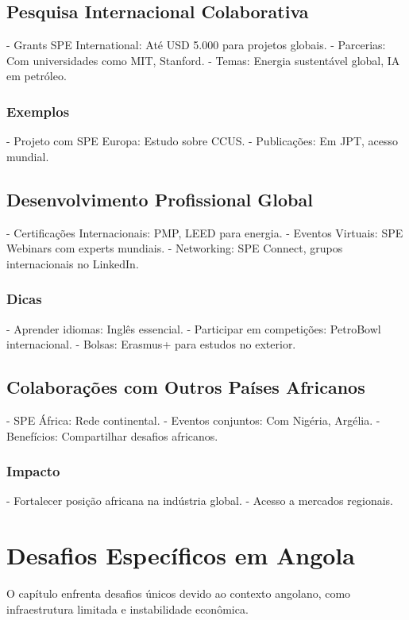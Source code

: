 \documentclass[12pt]{article}
\begin{document}
\subsection{Pesquisa Internacional Colaborativa}
- Grants SPE International: Até USD 5.000 para projetos globais.
- Parcerias: Com universidades como MIT, Stanford.
- Temas: Energia sustentável global, IA em petróleo.

\subsubsection{Exemplos}
- Projeto com SPE Europa: Estudo sobre CCUS.
- Publicações: Em JPT, acesso mundial.

\subsection{Desenvolvimento Profissional Global}
- Certificações Internacionais: PMP, LEED para energia.
- Eventos Virtuais: SPE Webinars com experts mundiais.
- Networking: SPE Connect, grupos internacionais no LinkedIn.

\subsubsection{Dicas}
- Aprender idiomas: Inglês essencial.
- Participar em competições: PetroBowl internacional.
- Bolsas: Erasmus+ para estudos no exterior.

\subsection{Colaborações com Outros Países Africanos}
- SPE África: Rede continental.
- Eventos conjuntos: Com Nigéria, Argélia.
- Benefícios: Compartilhar desafios africanos.

\subsubsection{Impacto}
- Fortalecer posição africana na indústria global.
- Acesso a mercados regionais.

\section{Desafios Específicos em Angola}

O capítulo enfrenta desafios únicos devido ao contexto angolano, como infraestrutura limitada e instabilidade econômica.
\end{document}
